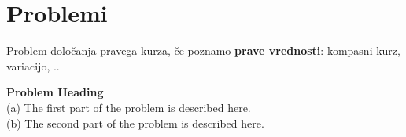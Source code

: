 \section*{Problemi}
%
\begin{prob}
	\label{prob1}
	Problem določanja pravega kurza, če poznamo \textbf{prave vrednosti}: kompasni kurz, variacijo, .. %
\end{prob}

\begin{prob}
	\label{prob2}
	\textbf{Problem Heading}\\
	(a) The first part of the problem is described here.\\
	(b) The second part of the problem is described here.
\end{prob}



%
